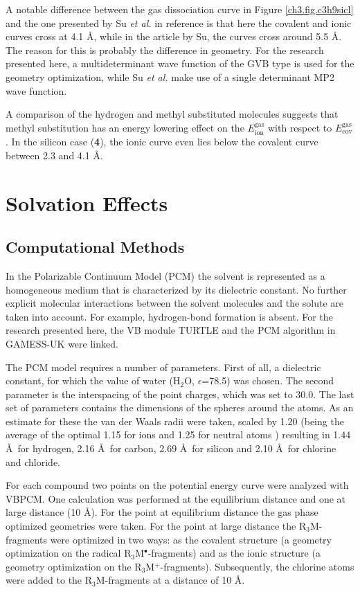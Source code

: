 A notable difference between the gas dissociation curve in Figure \ref{ch3.fig.c3h9sicl}  and the one presented by Su \textit{et al.} in reference \cite{psu} is that here the covalent and ionic curves cross at 4.1 \AA, while in the article by Su, the curves cross around 5.5 \AA. The reason for this is probably the difference in geometry. For the research presented here, a multideterminant wave function of the GVB type is used for the geometry optimization, while Su \textit{et al.} make use of a single determinant MP2 \cite{mp2} wave function.

A comparison of the hydrogen and methyl substituted molecules suggests that methyl substitution has an energy lowering effect on the $E_\mathrm{ion}^\mathrm{gas}$ with respect to $E_\mathrm{cov}^\mathrm{gas}$. In the silicon case (\textbf{4}), the ionic curve even lies below the covalent curve between 2.3 and 4.1 \AA.

\section{\label{ch3.sec.solv}Solvation Effects}

\subsection{Computational Methods}

In the Polarizable Continuum Model (PCM) the solvent is represented as a homogeneous medium that is characterized by its dielectric constant. No further explicit molecular interactions between the solvent molecules and the solute are taken into account. For example, hydrogen-bond formation is absent. For the research presented here, the VB module TURTLE and the PCM algorithm in GAMESS-UK were linked.

The PCM model requires a number of parameters. First of all, a dielectric constant, for which the value of water (H$_2$O, $\epsilon$=78.5) was chosen. The second parameter is the interspacing of the point charges, which was set to 30.0\degrees. The last set of parameters contains the dimensions of the spheres around the atoms. As an estimate for these the van der Waals radii \cite{bondi} were taken, scaled by 1.20 (being the average of the optimal 1.15 for ions and 1.25 for neutral atoms \cite{scaling}) resulting in 1.44 \AA\  for hydrogen, 2.16 \AA\  for carbon, 2.69 \AA\ for silicon and 2.10 \AA\ for chlorine and chloride.

For each compound two points on the potential energy curve were analyzed with VBPCM. One calculation was performed at the equilibrium distance and one at large distance (10 \AA). For the point at equilibrium distance the gas phase optimized geometries were taken. For the point at large distance the R$_3$M-fragments were optimized in two ways: as the covalent structure (a geometry optimization on the radical R$_3$M$^\bullet$-fragments) and as the ionic structure (a geometry optimization on the R$_3$M$^{+}$-fragments). Subsequently, the chlorine atoms were added to the R$_3$M-fragments at a distance of 10 \AA. 

